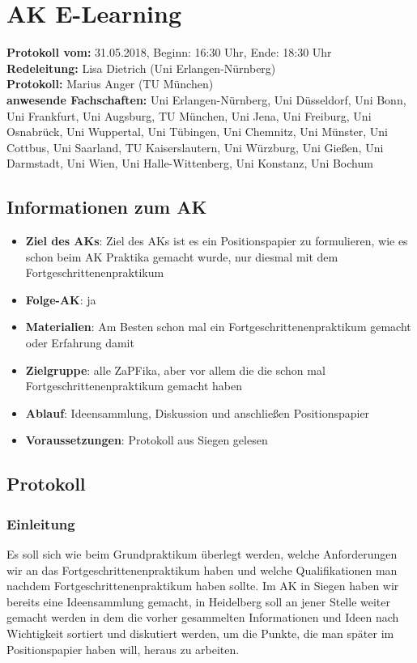 
\section{AK E-Learning}

\textbf{Protokoll vom:} 31.05.2018,
Beginn: 16:30 Uhr,
Ende: 18:30 Uhr \\
\textbf{Redeleitung:} Lisa Dietrich (Uni Erlangen-Nürnberg) \\
\textbf{Protokoll:} Marius Anger (TU München) \\
\textbf{anwesende Fachschaften:} Uni Erlangen-Nürnberg, Uni Düsseldorf, Uni Bonn, Uni Frankfurt, Uni Augsburg,
TU München, Uni Jena, Uni Freiburg, Uni Osnabrück, Uni Wuppertal, Uni Tübingen, Uni Chemnitz, Uni Münster, Uni Cottbus, Uni Saarland,
TU Kaiserslautern, Uni Würzburg, Uni Gießen, Uni Darmstadt, Uni Wien, Uni Halle-Wittenberg, Uni Konstanz, Uni Bochum

\subsection*{Informationen zum AK}
	\begin{itemize}
		\item \textbf{Ziel des AKs}: Ziel des AKs ist es ein Positionspapier zu formulieren, wie es schon beim AK Praktika gemacht wurde, nur diesmal mit dem Fortgeschrittenenpraktikum
		\item \textbf{Folge-AK}: ja
	  \item \textbf{Materialien}: Am Besten schon mal ein Fortgeschrittenenpraktikum gemacht oder Erfahrung damit
		\item \textbf{Zielgruppe}: alle ZaPFika, aber vor allem die die schon mal Fortgeschrittenenpraktikum gemacht haben
		\item \textbf{Ablauf}: Ideensammlung, Diskussion und anschließen Positionspapier
		\item \textbf{Voraussetzungen}: Protokoll aus Siegen gelesen
	\end{itemize}

\subsection*{Protokoll}
  \subsubsection*{Einleitung}
    Es soll sich wie beim Grundpraktikum überlegt werden, welche Anforderungen wir an das Fortgeschrittenenpraktikum haben und welche Qualifikationen man nachdem Fortgeschrittenenpraktikum haben sollte. Im AK in Siegen haben wir bereits eine Ideensammlung gemacht, in Heidelberg soll an jener Stelle weiter gemacht werden in dem die vorher gesammelten Informationen und Ideen nach Wichtigkeit sortiert und diskutiert werden, um die Punkte, die man später im Positionspapier haben will, heraus zu arbeiten.

